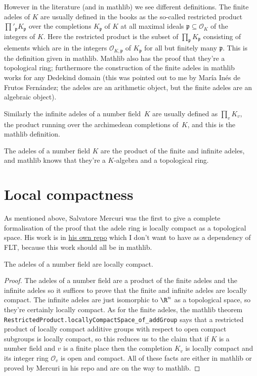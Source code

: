 However in the literature (and in mathlib) we see different definitions.
The finite adeles of $K$ are usually defined in the books
as the so-called restricted product $\prod'_{\mathfrak{p}}K_{\mathfrak{p}}$ over the completions
$K_{\mathfrak{p}}$ of $K$ at all maximal ideals $\mathfrak{p}\subseteq\mathcal{O}_K$ of the
integers of $K$. Here the restricted product is the subset of $\prod_{\mathfrak{p}}K_{\mathfrak{p}}$
consisting of elements which are in the integers $\mathcal{O}_{K,\mathfrak{p}}$ of
$K_{\mathfrak{p}}$ for all but finitely many $\mathfrak{p}$. This is the definition given in
mathlib. Mathlib also has the proof that they're a topological ring;
furthermore the construction of the finite adeles in mathlib works for any
Dedekind domain (this was pointed out to me by Mar\'ia In\'es
de Frutos Fern\'andez; the adeles
are an arithmetic object, but the finite adeles are an algebraic object).

Similarly the infinite adeles of a number field~$K$
are usually defined as $\prod_v K_v$,
the product running over the archimedean completions of~$K$, and this is
the mathlib definition.

The adeles of a number field $K$ are the product of the finite and infinite
adeles, and mathlib knows that they're a $K$-algebra and a topological ring.

\section{Local compactness}

As mentioned above, Salvatore Mercuri was the first to give a complete formalisation of the proof
that the adele ring is locally compact as a topological space. His work is in
\href{https://github.com/smmercuri/adele-ring_locally-compact}{his own repo} which
I don't want to have as a dependency of FLT, because this work should all be
in mathlib.

\begin{theorem}
  \label{NumberField.AdeleRing.locallyCompactSpace}
  \leanok
  The adeles of a number field are locally compact.
\end{theorem}
\begin{proof}
  The adeles of a number field are a product of the finite adeles and the infinite adeles
  so it suffices to prove that the finite and infinite adeles are locally compact.
  The infinite adeles are just isomorphic to $\R^n$ as a topological space, so they're certainly
  locally compact. As for the finite adeles,
  the mathlib theorem {\tt RestrictedProduct.locallyCompactSpace\_of\_addGroup}
  says that a restricted product of locally compact additive groups with respect to open compact
  subgroups is locally compact, so this reduces us to the claim that if $K$ is a number field
  and $v$ is a finite place then the completion $K_v$ is locally compact and its integer
  ring $\mathcal{O}_v$ is open and compact. All of these facts are either in mathlib or
  proved by Mercuri in his repo and are on the way to mathlib.
\end{proof}

